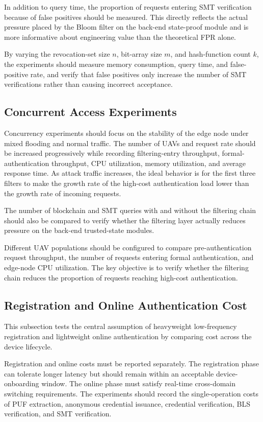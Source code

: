 \documentclass[lettersize,journal]{IEEEtran}
\begin{document}
	In addition to query time, the proportion of requests entering SMT verification because of false positives should be measured. This directly reflects the actual pressure placed by the Bloom filter on the back-end state-proof module and is more informative about engineering value than the theoretical FPR alone.
	
	By varying the revocation-set size $n$, bit-array size $m$, and hash-function count $k$, the experiments should measure memory consumption, query time, and false-positive rate, and verify that false positives only increase the number of SMT verifications rather than causing incorrect acceptance.
	
	\subsection{Concurrent Access Experiments}
	
	Concurrency experiments should focus on the stability of the edge node under mixed flooding and normal traffic. The number of UAVs and request rate should be increased progressively while recording filtering-entry throughput, formal-authentication throughput, CPU utilization, memory utilization, and average response time. As attack traffic increases, the ideal behavior is for the first three filters to make the growth rate of the high-cost authentication load lower than the growth rate of incoming requests.
	
	The number of blockchain and SMT queries with and without the filtering chain should also be compared to verify whether the filtering layer actually reduces pressure on the back-end trusted-state modules.
	
	Different UAV populations should be configured to compare pre-authentication request throughput, the number of requests entering formal authentication, and edge-node CPU utilization. The key objective is to verify whether the filtering chain reduces the proportion of requests reaching high-cost authentication.
	
	\subsection{Registration and Online Authentication Cost}
	This subsection tests the central assumption of heavyweight low-frequency registration and lightweight online authentication by comparing cost across the device lifecycle.
	
	
	Registration and online costs must be reported separately. The registration phase can tolerate longer latency but should remain within an acceptable device-onboarding window. The online phase must satisfy real-time cross-domain switching requirements. The experiments should record the single-operation costs of PUF extraction, anonymous credential issuance, credential verification, BLS verification, and SMT verification.
	
\end{document}
